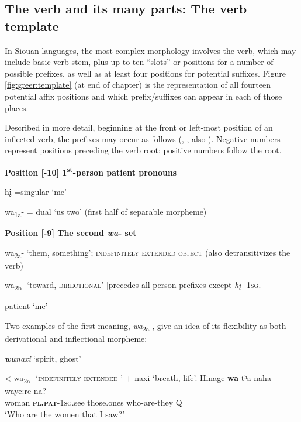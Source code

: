 \documentclass[output=paper]{LSP/langsci}
\begin{document}
\subsection{The verb and its many parts: The verb template}\label{sec:greer:3.2}\label{verbanditsmanyparts}  
	  									                      
In Siouan languages, the most complex morphology involves the verb, which may include basic verb stem, plus up to ten ``slots'' or positions for a number of possible prefixes, as well as at least four positions for potential suffixes.  Figure \ref{fig:greer:template} (at end of chapter) is the representation of all fourteen potential affix positions and which prefix/suffixes can appear in each of those places. 

Described in more detail, beginning at the front or left-most position of an inflected verb, the prefixes may occur as follows (\citealt[246]{Whitman1947}, \citealt{Marsh1936}, also \citealt{HopkinsFurbee1991}). Negative numbers represent positions preceding the verb root; positive numbers follow the root.

\vspace{1em}
\textbf{Position [-10] 	1\textsuperscript{st}-person patient pronouns} 	

\hspace{2em} h\k{i} =singular `me' 
												
\hspace{2em} wa\textsubscript{1a}- = dual  `us two'	 (first half of separable morpheme)					           

\vspace{1em}
\textbf{Position [-9] 	The second \textit{wa-}  set} 	
										
\hspace{2em} wa\textsubscript{2a}- `them, something'; \textsc{indefinitely extended object} (also detransitivizes the verb)		
	
\hspace{2em} wa\textsubscript{2b}- `toward, \textsc{directional}' 	[precedes all person prefixes except \textit{h\k{i}}- 1\textsc{sg}.

\hspace{3em} patient `me'] 	 				      

\vspace{1em}
Two examples of the first meaning, \textit{wa}\textsubscript{2a}-, give an idea of its flexibility as both derivational and inflectional morpheme:    	

\begin{exe}
\ex
\begin{xlist}
\ex \textit{\textbf{wa}naxi} `spirit, ghost' 

< wa\textsubscript{2a}- `\textsc{indefinitely extended }' + naxi `breath, life'.                  	
\ex \gll Hinage   \textbf{wa}-tʰa  naha   waye:re  na?  \\           			
woman   \textbf{\textsc{pl.pat}}-\textsc{1sg.}see  those.ones who-are-they Q	\\
\trans `Who are the women that I saw?'
\end{xlist}
\end{exe}
\end{document}
